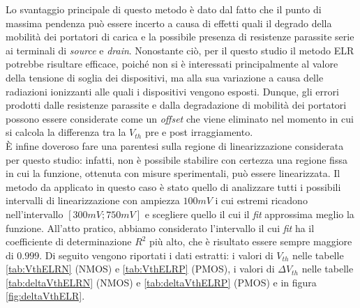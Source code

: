 Lo svantaggio principale di questo metodo è dato dal fatto che il punto di massima pendenza può essere incerto a causa di effetti quali il degrado della mobilità dei portatori di carica e la possibile presenza di resistenze parassite serie ai terminali di \emph{source} e \emph{drain}.
Nonostante ciò, per il questo studio il metodo ELR potrebbe risultare efficace, poiché non si è interessati principalmente al valore della tensione di soglia dei dispositivi, ma alla sua variazione a causa delle radiazioni ionizzanti alle quali i dispositivi vengono esposti. Dunque, gli errori prodotti dalle resistenze parassite e dalla degradazione di mobilità dei portatori possono essere considerate come un \textit{offset} che viene eliminato nel momento in cui si calcola la differenza tra la $V_{th}$ pre e post irraggiamento.\\
È infine doveroso fare una parentesi sulla regione di linearizzazione considerata per questo studio: infatti, non è possibile stabilire con certezza una regione fissa in cui la funzione, ottenuta con misure sperimentali, può essere linearizzata. Il metodo da applicato in questo caso è stato quello di analizzare tutti i possibili intervalli di linearizzazione con ampiezza $100 mV$ i cui estremi ricadono nell'intervallo $[300 mV ; 750mV]$ e scegliere quello il cui il \emph{fit} approssima meglio la funzione. All'atto pratico, abbiamo considerato l'intervallo il cui \emph{fit} ha il coefficiente di determinazione $R^2$ più alto, che è risultato essere sempre maggiore di $0.999$. Di seguito vengono riportati i dati estratti: i valori di ${V_{th}}$ nelle tabelle \ref{tab:VthELRN} (NMOS) e \ref{tab:VthELRP} (PMOS), i valori di $\Delta V_{th}$ nelle tabelle \ref{tab:deltaVthELRN} (NMOS) e \ref{tab:deltaVthELRP} (PMOS) e in figura \ref{fig:deltaVthELR}.  

\clearpage

